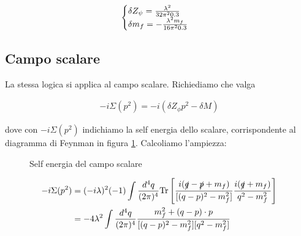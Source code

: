 \documentclass[11pt]{report}
\begin{document}
\begin{align}
    \begin{cases}
        \delta Z_\psi = \frac{\lambda^2}{32\pi^20.3} \\ 
        \delta m_f = -\frac{\lambda^2 m_f}{16\pi^20.3}
    \end{cases}
\end{align}

\subsection{Campo scalare}

La stessa logica si applica al campo scalare. Richiediamo che valga 

\begin{align}
    \label{eq:scalarpropagatorrenormalizationcondition}
    -i\Sigma(p^2) = -i(\delta Z_\phi p^2 - \delta M)
\end{align}

dove con \(-i\Sigma(p^2)\) indichiamo la self energia dello scalare, corrispondente al diagramma di Feynman in figura \ref{fig:scalarselfenergy}. Calcoliamo l'ampiezza: 

\begin{figure}
    \caption{Self energia del campo scalare}
    \label{fig:scalarselfenergy}
    \begin{center}
    \end{center}
\end{figure}


\begin{align}
    -i\Sigma(p^2) &= (-i\lambda)^2(-1)\int \frac{d^4q}{(2\pi)^4}\text{Tr}\left[\frac{i(\slashed{q}-\slashed{p}+m_f)}{[(q-p)^2 - m_f^2]}\frac{i(\slashed{q}+m_f)}{q^2-m^2_f}\right] \notag \\ 
    &= -4\lambda^2 \int \frac{d^4q}{(2\pi)^4}\frac{m_f^2 + (q-p)\cdot p}{[(q-p)^2 - m^2_f][q^2 - m^2_f]}
\end{align}
\end{document}
